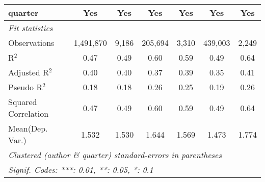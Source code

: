 \begin{tabular}{lcccccc}
   quarter                                                    & Yes            & Yes           & Yes            & Yes     & Yes            & Yes\\  
   \midrule
   \emph{Fit statistics}\\
   Observations                                               & 1,491,870      & 9,186         & 205,694        & 3,310   & 439,003        & 2,249\\  
   R$^2$                                                      & 0.47           & 0.49          & 0.60           & 0.59    & 0.49           & 0.64\\  
   Adjusted R$^2$                                             & 0.40           & 0.40          & 0.37           & 0.39    & 0.35           & 0.41\\  
   Pseudo R$^2$                                               & 0.18           & 0.18          & 0.26           & 0.25    & 0.19           & 0.26\\  
   Squared Correlation                                        & 0.47           & 0.49          & 0.60           & 0.59    & 0.49           & 0.64\\  
Mean(Dep. Var.) & 1.532 & 1.530 & 1.644 & 1.569 & 1.473 & 1.774 \\
   \midrule \midrule
   \multicolumn{7}{l}{\emph{Clustered (author \& quarter) standard-errors in parentheses}}\\
   \multicolumn{7}{l}{\emph{Signif. Codes: ***: 0.01, **: 0.05, *: 0.1}}\\
\end{tabular}
\par\endgroup
